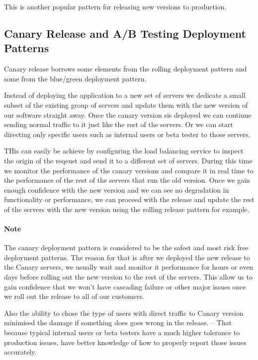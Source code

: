 This is another popular pattern for releasing new versions to production.

\subsection{Canary Release and A/B Testing Deployment Patterns}
Canary release borrows some elements from the rolling deployment pattern and some from the blue/green deployment pattern.

Instead of deploying the application to a new set of servers we dedicate a small subset of the existing group of servers and update them with the new version of our software straight away.
Once the canary version sis deployed we can continue sending normal traffic to it just like the rest of the servers.
Or we can start directing only specific users such as internal users or beta tester to those servers.

THis can easily be achieve by configuring the load balancing service to inspect the origin of the reqeust and send it to a different set of servers.
During this time we monitor the performance of the canary versions and compare it in real time to the performance of the rest of the servers that run the old version.
Once we gain enough confidence with the new version and we can see no degradation in functionality or performance, we can proceed with the release and update the rest of the servers with the new version using the rolling release pattern for example.

\paragraph{Note} The canary deployment pattern is considered to be the safest and most risk free deployment patterns.
The reason for that is after we deployed the new release to the Canary servers, we usually wait and monitor it performance for hours or even days before rolling out the new version to the rest of the servers.
This allow us to gain confidence that we won't have cascading failure or other major issues once we roll out the release to all of our customers.

Also the ability to chose the type of users with direct traffic to Canary version minimised the damage if something does goes wrong in the release.
-- That because typical internal users or beta testers have a much higher tolerance to production issues, have better knowledge of how to properly report those issues accurately.

